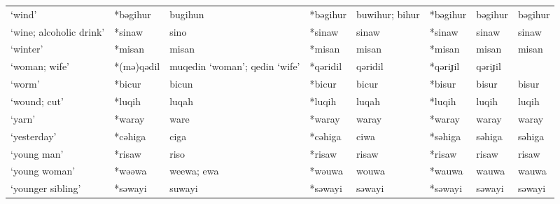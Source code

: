 \begin{landscape}
\begin{longtable}[c]{@{}p{3cm}<{\raggedright}p{2.75cm}<{\raggedright}p{2.75cm}<{\raggedright}p{2.75cm}<{\raggedright}p{2.75cm}<{\raggedright}p{2.75cm}<{\raggedright}p{2.75cm}<{\raggedright}p{2.75cm}<{\raggedright}@{}}
`wind'                                               & *bəgihur     & bugihun                       & *bəgihur       & buwihur; bihur             & *bəgihur         & bəgihur                  & bəgihur                           \\
`wine; alcoholic drink'                              & *sinaw       & sino                          & *sinaw         & sinaw                      & *sinaw           & sinaw                    & sinaw                             \\
`winter'                                             & *misan       & misan                         & *misan         & misan                      & *misan           & misan                    & misan                             \\
`woman; wife'                                        & *(mə)qədil   & muqedin `woman'; qedin `wife' & *qəridil       & qəridil                    & *qəriɟil         & qəriɟil                  &                                   \\
`worm'                                               & *bicur       & bicun                         & *bicur         & bicur                      & *bisur           & bisur                    & bisur                             \\
`wound; cut'                                         & *luqih       & luqah                         & *luqih         & luqah                      & *luqih           & luqih                    & luqih                             \\
`yarn'                                               & *waray       & ware                          & *waray         & waray                      & *waray           & waray                    & waray                             \\
`yesterday'                                          & *cəhiga      & ciga                          & *cəhiga        & ciwa                       & *səhiga          & səhiga                   & səhiga                            \\
`young man'                                          & *risaw       & riso                          & *risaw         & risaw                      & *risaw           & risaw                    & risaw                             \\
`young woman'                                        & *wəəwa       & weewa; ewa                    & *wəuwa         & wouwa                      & *wauwa           & wauwa                    & wauwa                             \\
`younger sibling'                                    & *səwayi      & suwayi                        & *səwayi        & səwayi                     & *səwayi          & səwayi                   & səwayi                            \\* 


\end{longtable}
\end{landscape}
